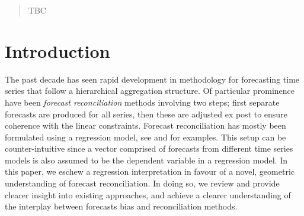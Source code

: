 \documentclass[12pt]{article}
\theoremstyle{definition}
\theoremstyle{property}
\begin{document}
	\bigskip
	
	
	\begin{abstract} TBC
	\end{abstract}
	
	
	\newpage
	
	\section{Introduction}\label{sec:intro}
	
	The past decade has seen rapid development in methodology for forecasting time series that follow a hierarchical aggregation structure.  Of particular prominence have been {\em forecast reconciliation} methods involving two steps; first separate forecasts are produced for all series, then these are adjusted ex post to ensure coherence with the linear constraints.  Forecast reconciliation has mostly been formulated using a regression model, see \cite{Hyndman2011} and \cite{WicEtAl2019} for examples.  This setup can be counter-intuitive since a vector comprised of forecasts from different time series models is also assumed to be the dependent variable in a regression model.  In this paper, we eschew a regression interpretation in favour of a novel, geometric understanding of forecast reconciliation.  In doing so, we review and provide clearer insight into existing approaches, and achieve a clearer understanding of the interplay between forecasts bias and reconciliation methods. 
	
\end{document}
